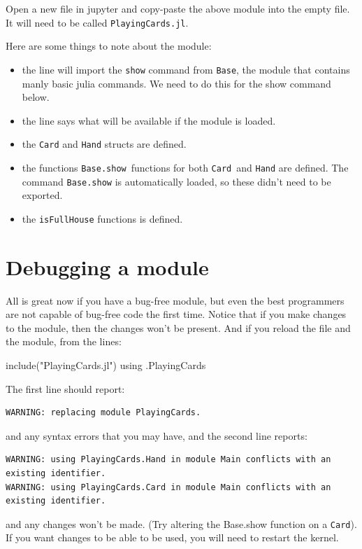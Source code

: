 Open a new file in jupyter and copy-paste the above module
into the empty file. It will need to be called \texttt{PlayingCards.jl}.

Here are some things to note about the module:
\begin{itemize}
\item the  line will import the \verb!show! command from \verb!Base!, the module that contains manly basic julia commands.  We need to do this for the show command below. 
\item the  line says what will be available if the module is loaded. 
\item the \verb!Card! and \verb!Hand! structs are defined.
\item the functions \verb!Base.show!~functions for both \verb!Card!~and \verb!Hand! are defined.  The command \verb!Base.show! is automatically loaded, so these didn't need to be exported. 
\item the \verb!isFullHouse! functions is defined. 
\end{itemize}



\section{Debugging a module}\label{debugging-a-module}

All is great now if you have a bug-free module, but even the best
programmers are not capable of bug-free code the first time. Notice that
if you make changes to the module, then the changes won't be present.
And if you reload the file and the module, from the lines:

\begin{jlverbatim}
include("PlayingCards.jl")
using .PlayingCards
\end{jlverbatim}

The first line should report:

\begin{Verbatim}
WARNING: replacing module PlayingCards.
\end{Verbatim}

and any syntax errors that you may have, and the second line reports:

\begin{Verbatim}
WARNING: using PlayingCards.Hand in module Main conflicts with an existing identifier.
WARNING: using PlayingCards.Card in module Main conflicts with an existing identifier.
\end{Verbatim}
%
and any changes won't be made. (Try altering the Base.show function on a \texttt{Card}). If you want changes to be able to be used, you will need to restart the kernel.


